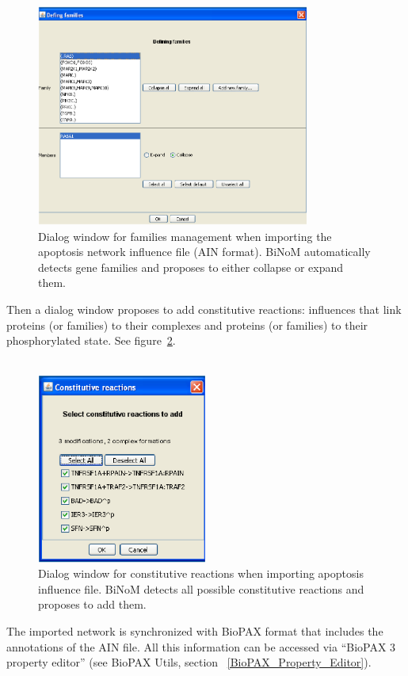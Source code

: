 \begin{figure}
\centering
\includegraphics[width=0.8\textwidth]{graphics/AIN_dialog_for_families_management}
\caption{Dialog window for families management when importing the apoptosis network influence file (AIN format). BiNoM automatically detects gene families and proposes to either collapse or expand them.}
\label{AIN_dialog_for_families_management}
\end{figure}

Then a dialog window proposes to add constitutive reactions: influences that
link proteins (or families) to their complexes and proteins (or families) to
their phosphorylated state. See
figure~\ref{AIN_dialog_for_constitutive_reactions}.\\\\

\begin{figure}
\centering
\includegraphics[width=0.5\textwidth]{graphics/AIN_dialog_for_constitutive_reactions}
\caption{Dialog window for constitutive reactions when importing apoptosis influence file. BiNoM detects all possible constitutive reactions and proposes to add them.}
\label{AIN_dialog_for_constitutive_reactions}
\end{figure}
The imported network is synchronized with BioPAX format that includes the annotations of the AIN file. All this information can be accessed via “BioPAX 3 property editor” (see BioPAX Utils, section ~\ref{BioPAX_Property_Editor}).

